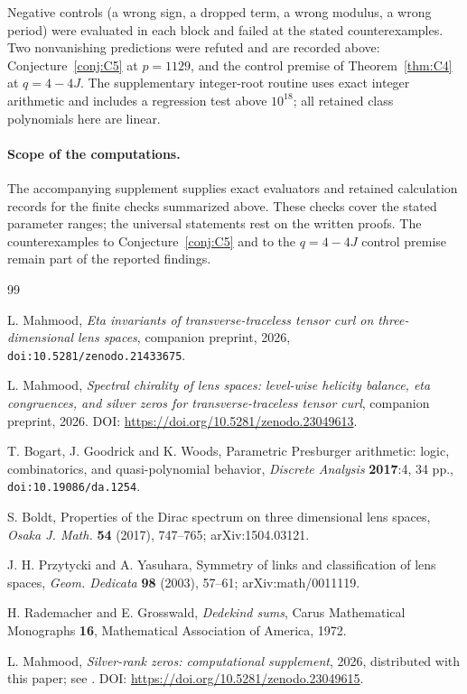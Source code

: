 \documentclass[11pt]{article}
\theoremstyle{definition}
\begin{document}
Negative controls (a wrong sign, a dropped term, a wrong modulus, a wrong
period) were evaluated in each block and failed at the stated
counterexamples.  Two nonvanishing predictions were refuted and are
recorded above: Conjecture~\ref{conj:C5} at $p=1129$, and the control
premise of Theorem~\ref{thm:C4} at $q=4-4J$.  The supplementary
integer-root routine uses exact integer arithmetic and includes a
regression test above $10^{18}$; all retained class polynomials here are
linear.

\paragraph{Scope of the computations.}  The accompanying supplement
\cite{LCrecord} supplies exact evaluators and retained calculation records
for the finite checks summarized above.  These checks cover the stated
parameter ranges; the universal statements rest on the written proofs.
The counterexamples to Conjecture~\ref{conj:C5} and to the
$q=4-4J$ control premise remain part of the reported findings.


\begin{thebibliography}{99}

L. Mahmood, \emph{Eta invariants of transverse-traceless tensor curl on
three-dimensional lens spaces}, companion preprint, 2026,
\texttt{doi:10.5281/zenodo.21433675}.

L. Mahmood, \emph{Spectral chirality of lens spaces: level-wise helicity
balance, eta congruences, and silver zeros for transverse-traceless
tensor curl}, companion preprint, 2026. DOI:
\url{https://doi.org/10.5281/zenodo.23049613}.

T. Bogart, J. Goodrick and K. Woods, Parametric Presburger arithmetic:
logic, combinatorics, and quasi-polynomial behavior, \emph{Discrete
Analysis} \textbf{2017}:4, 34 pp., \texttt{doi:10.19086/da.1254}.

S. Boldt, Properties of the Dirac spectrum on three dimensional lens
spaces, \emph{Osaka J. Math.} \textbf{54} (2017), 747--765; arXiv:1504.03121.

J. H. Przytycki and A. Yasuhara, Symmetry of links and classification of
lens spaces, \emph{Geom. Dedicata} \textbf{98} (2003), 57--61;
arXiv:math/0011119.

H. Rademacher and E. Grosswald, \emph{Dedekind sums}, Carus Mathematical
Monographs \textbf{16}, Mathematical Association of America, 1972.

L. Mahmood, \emph{Silver-rank zeros: computational supplement}, 2026,
distributed with this paper; see .
DOI: \url{https://doi.org/10.5281/zenodo.23049615}.

\end{thebibliography}
\end{document}

